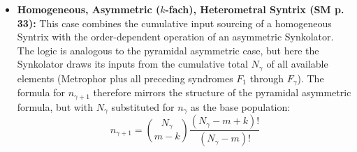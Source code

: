 \documentclass[12pt]{article}
\newcommand{\synkolationsstufe}{m}
\newcommand{\syndrom}{F} %
\begin{document}
\begin{itemize}
    \item \textbf{Homogeneous, Asymmetric (\( k \)-fach), Heterometral Syntrix (SM p. 33):}
    This case combines the cumulative input sourcing of a homogeneous Syntrix with the order-dependent operation of an asymmetric Synkolator. The logic is analogous to the pyramidal asymmetric case, but here the Synkolator draws its inputs from the cumulative total \( N_\gamma \) of all available elements (Metrophor plus all preceding syndromes \( \syndrom_1 \) through \( \syndrom_\gamma \)). The formula for \( n_{\gamma+1} \) therefore mirrors the structure of the pyramidal asymmetric formula, but with \( N_\gamma \) substituted for \( n_\gamma \) as the base population:
    \begin{equation*}
    n_{\gamma+1} = \binom{N_\gamma}{\synkolationsstufe-k} \frac{(N_\gamma-\synkolationsstufe+k)!}{(N_\gamma-\synkolationsstufe)!}
    \end{equation*}


\end{itemize}
\end{document}
